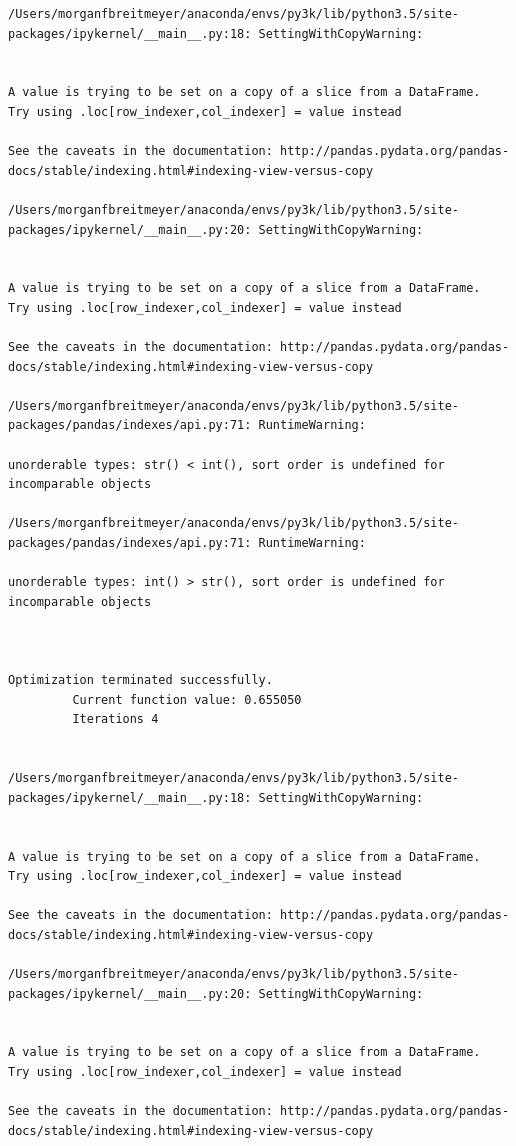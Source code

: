 \begin{lstlisting}
/Users/morganfbreitmeyer/anaconda/envs/py3k/lib/python3.5/site-packages/ipykernel/__main__.py:18: SettingWithCopyWarning:


A value is trying to be set on a copy of a slice from a DataFrame.
Try using .loc[row_indexer,col_indexer] = value instead

See the caveats in the documentation: http://pandas.pydata.org/pandas-docs/stable/indexing.html#indexing-view-versus-copy

/Users/morganfbreitmeyer/anaconda/envs/py3k/lib/python3.5/site-packages/ipykernel/__main__.py:20: SettingWithCopyWarning:


A value is trying to be set on a copy of a slice from a DataFrame.
Try using .loc[row_indexer,col_indexer] = value instead

See the caveats in the documentation: http://pandas.pydata.org/pandas-docs/stable/indexing.html#indexing-view-versus-copy

/Users/morganfbreitmeyer/anaconda/envs/py3k/lib/python3.5/site-packages/pandas/indexes/api.py:71: RuntimeWarning:

unorderable types: str() < int(), sort order is undefined for incomparable objects

/Users/morganfbreitmeyer/anaconda/envs/py3k/lib/python3.5/site-packages/pandas/indexes/api.py:71: RuntimeWarning:

unorderable types: int() > str(), sort order is undefined for incomparable objects



Optimization terminated successfully.
         Current function value: 0.655050
         Iterations 4


/Users/morganfbreitmeyer/anaconda/envs/py3k/lib/python3.5/site-packages/ipykernel/__main__.py:18: SettingWithCopyWarning:


A value is trying to be set on a copy of a slice from a DataFrame.
Try using .loc[row_indexer,col_indexer] = value instead

See the caveats in the documentation: http://pandas.pydata.org/pandas-docs/stable/indexing.html#indexing-view-versus-copy

/Users/morganfbreitmeyer/anaconda/envs/py3k/lib/python3.5/site-packages/ipykernel/__main__.py:20: SettingWithCopyWarning:


A value is trying to be set on a copy of a slice from a DataFrame.
Try using .loc[row_indexer,col_indexer] = value instead

See the caveats in the documentation: http://pandas.pydata.org/pandas-docs/stable/indexing.html#indexing-view-versus-copy


\end{lstlisting}
